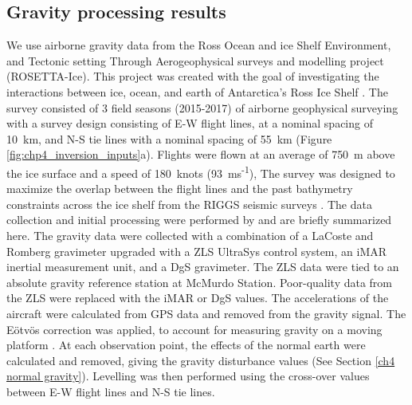 \subsection{Gravity processing results} \label{chp4_gravity_processing_results}

We use airborne gravity data from the Ross Ocean and ice Shelf Environment, and Tectonic setting Through Aerogeophysical surveys and modelling project (ROSETTA-Ice). This project was created with the goal of investigating the interactions between ice, ocean, and earth of Antarctica's Ross Ice Shelf \citep{tintoross2019}. The survey consisted of 3 field seasons (2015-2017) of airborne geophysical surveying with a survey design consisting of E-W flight lines, at a nominal spacing of 10~km, and N-S tie lines with a nominal spacing of 55~km (Figure \ref{fig:chp4_inversion_inputs}a). Flights were flown at an average of 750~m above the ice surface and a speed of 180~knots (93~ms\textsuperscript{-1}), The survey was designed to maximize the overlap between the flight lines and the past bathymetry constraints across the ice shelf from the RIGGS seismic surveys \citep{bentleyross1984}. The data collection and initial processing were performed by \citet{tintoross2019} and are briefly summarized here. The gravity data were collected with a combination of a LaCoste and Romberg gravimeter upgraded with a ZLS UltraSys control system, an iMAR inertial measurement unit, and a DgS gravimeter. The ZLS data were tied to an absolute gravity reference station at McMurdo Station. Poor-quality data from the ZLS were replaced with the iMAR or DgS values. The accelerations of the aircraft were calculated from GPS data and removed from the gravity signal. The E\"{o}tv\"{o}s correction was applied, to account for measuring gravity on a moving platform \citep{harlaneotvos1968}. At each observation point, the effects of the normal earth were calculated and removed, giving the gravity disturbance values (See Section \ref{ch4 normal gravity}). Levelling was then performed using the cross-over values between E-W flight lines and N-S tie lines.\\

